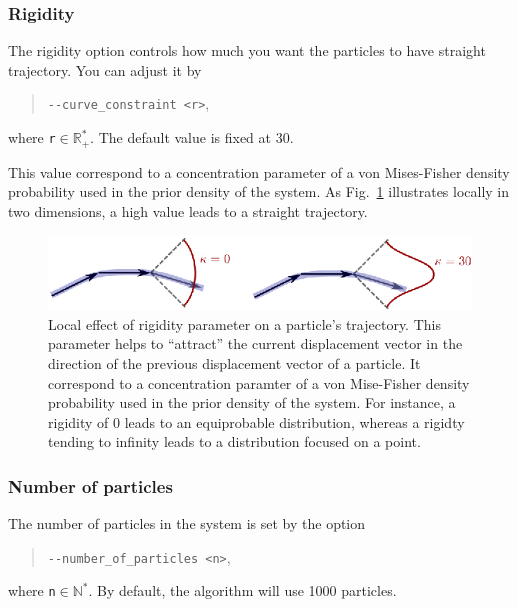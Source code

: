     \subsubsection*{Rigidity}
        The rigidity option controls how much you want the particles to have straight trajectory. You can adjust it by
            \begin{quote}
                \texttt{-\hspace{0.1mm}-curve\_constraint <r>},
            \end{quote}
        where \texttt{r}$\in\mathbb{R}_+^*$. The default value is fixed at 30.

        This value correspond to a concentration parameter of a von Mises-Fisher density probability used in the prior density of the system. As Fig.~\ref{tracto-fig:concentration} illustrates locally in two dimensions, a high value leads to a straight trajectory.

        \begin{figure}
            \centering
            \includegraphics[height=0.1\textheight]{concentration}
            \caption{Local effect of rigidity parameter on a particle's trajectory. This parameter helps to ``attract'' the current displacement vector in the direction of the previous displacement vector of a particle. It correspond to a concentration paramter of a von Mise-Fisher density probability used in the prior density of the system. For instance, a rigidity of 0 leads to an equiprobable distribution, whereas a rigidty tending to infinity leads to a distribution focused on a point.}
            \label{tracto-fig:concentration}
        \end{figure}


    \subsubsection*{Number of particles}
        The number of particles in the system is set by the option
            \begin{quote}
                \texttt{-\hspace{0.1mm}-number\_of\_particles <n>},
            \end{quote}
        where \texttt{n}$\in\mathbb{N}^*$. By default, the algorithm will use 1000 particles.

